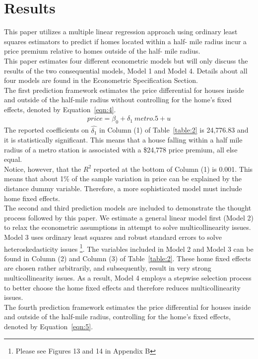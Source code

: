 \documentclass[12pt]{report}
\newcommand\tab[1][.60cm]{\hspace*{#1}}
\begin{document}
\section*{Results}
This paper utilizes a multiple linear regression approach using ordinary least squares estimators to predict if homes located within a half- mile radius incur a price premium relative to homes outside of the half- mile radius.\\
\tab This paper estimates four different econometric models but will only discuss the results of the two consequential models, Model 1 and Model 4. Details about all four models are found in the Econometric Specification Section.\\
\tab The first prediction framework estimates the price differential for houses inside and outside of the half-mile radius without controlling for the home's fixed effects, denoted by Equation~\ref{eqn:4}.
\begin{align}
\ price = \beta_0 +\delta_1\ metro.5 + u \ 
\label{eqn:4}
\end{align}
The reported coefficients on $\hat{\delta_1}$ in Column (1) of Table~\ref{table:2} is 24,776.83 and it is statistically significant. This means that a house falling within a half mile radius of a metro station is associated with a \$24,778 price premium, all else equal.\\
\tab Notice, however, that the $R^2$ reported at the bottom of Column (1) is 0.001. This means that about 1\% of the sample variation in price can be explained by the distance dummy variable. Therefore, a more sophisticated model must include home fixed effects.\\
\tab The second and third prediction models are included to demonstrate the thought process followed by this paper. We estimate a general linear model first (Model 2) to relax the econometric assumptions in attempt to solve multicollinearity issues. Model 3 uses ordinary least squares and robust standard errors to solve heteroskedasticity issues \footnote{Please see Figures 13 and 14 in Appendix B}. The variables included in Model 2 and Model 3 can be found in Column (2) and Column (3) of Table~\ref{table:2}. These home fixed effects are chosen rather arbitrarily, and subsequently, result in very strong multicollinearity issues. As a result, Model 4 employs a stepwise selection process to better choose the home fixed effects and therefore reduces multicollinearity issues. \\
\tab The fourth prediction framework estimates the price differential for houses inside and outside of the half-mile radius, controlling for the home's fixed effects, denoted by Equation~\ref{eqn:5}.
\end{document}
